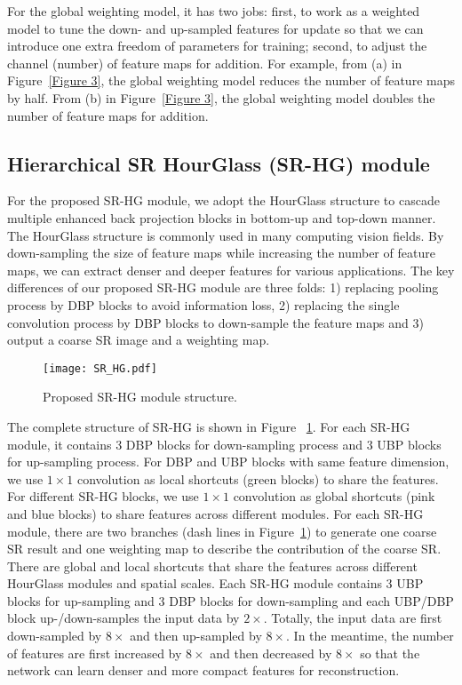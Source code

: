 \documentclass[10pt,twocolumn,letterpaper]{article}
\begin{document}
For the global weighting model, it has two jobs: first, to work as a weighted model to tune the down- and up-sampled features for update so that we can introduce one extra freedom of parameters for training; second, to adjust the channel (number) of feature maps for addition. For example, from (a) in Figure~\ref{Figure 3}, the global weighting model reduces the number of feature maps by half. From (b) in Figure~\ref{Figure 3}, the global weighting model doubles the number of feature maps for addition. 

\subsection{Hierarchical SR HourGlass (SR-HG) module}
For the proposed SR-HG module, we adopt the HourGlass structure to cascade multiple enhanced back projection blocks in bottom-up and top-down manner. The HourGlass structure is commonly used in many computing vision fields. By down-sampling the size of feature maps while increasing the number of feature maps, we can extract denser and deeper features for various applications. The key differences of our proposed SR-HG module are three folds: 1) replacing pooling process by DBP blocks to avoid information loss, 2) replacing the single convolution process by DBP blocks to down-sample the feature maps and 3) output a coarse SR image and a weighting map.

\begin{figure}[htb]
\vskip 0.01in
\begin{center}
\centerline{\texttt{[image: SR\_HG.pdf]}}
\caption{Proposed SR-HG module structure.}
\label{Figure 4}
\end{center}
\vskip -0.3in
\end{figure}

The complete structure of SR-HG is shown in Figure ~\ref{Figure 4}. For each SR-HG module, it contains 3 DBP blocks for down-sampling process and 3 UBP blocks for up-sampling process. For DBP and UBP blocks with same feature dimension, we use $1\times1$ convolution as local shortcuts (green blocks) to share the features. For different SR-HG blocks, we use $1\times1$ convolution as global shortcuts (pink and blue blocks) to share features across different modules. For each SR-HG module, there are two branches (dash lines in Figure~\ref{Figure 4}) to generate one coarse SR result and one weighting map to describe the contribution of the coarse SR. There are global and local shortcuts that share the features across different HourGlass modules and spatial scales. Each SR-HG module contains 3 UBP blocks for up-sampling and 3 DBP blocks for down-sampling and each UBP/DBP block up-/down-samples the input data by $2\times$. Totally, the input data are first down-sampled by $8\times$ and then up-sampled by $8\times$. In the meantime, the number of features are first increased by $8\times$ and then decreased by $8\times$ so that the network can learn denser and more compact features for reconstruction.
\end{document}
